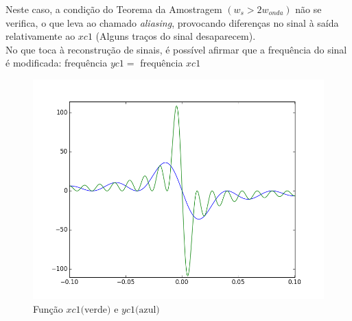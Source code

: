 \documentclass[a4paper, 12pt]{article}
\begin{document}
\begin{itemize}
          Neste caso, a condição do Teorema da Amostragem $(w_{s}>2w_{onda})$ não se verifica, o que leva ao chamado \textit{aliasing}, provocando diferenças no sinal à saída relativamente ao $xc1$ (Alguns traços do sinal desaparecem).\\
          No que toca à reconstrução de sinais, é possível afirmar que a frequência do sinal é modificada: frequência $yc1 =$ frequência $xc1$
          \begin{figure}[!ht]
              \includegraphics[width = 13.5cm]{images/Graf5.png}
              \vspace{-15px}
              \caption{Função $xc1 \textrm{(verde) e } yc1 \textrm{(azul)}$}
          \end{figure}
\end{itemize}
\end{document}
